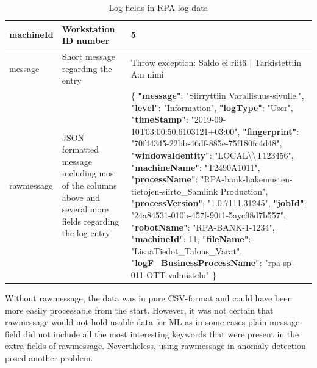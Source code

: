 \begin{table}[]
\begin{tabular}{|L{0.25\textwidth}|L{0.25\textwidth}|L{0.5\textwidth}|}
        machineId          & Workstation ID number                           & 5                                                                            \\ \hline
        message            & Short message regarding the entry               & Throw exception: Saldo ei riitä | \newline Tarkistettiin A:n nimi                    \\ \hline
        rawmessage         & JSON formatted message including most of the columns above and several more fields regarding the log entry &
        \{
        \textbf{"message"}: "Siirryttiin Varallisuus-sivulle.",\newline
        \textbf{"level"}: "Information",\newline
        \textbf{"logType"}: "User",\newline
        \textbf{"timeStamp"}: "2019-09-10T03:00:50.6103121+03:00",\newline
        \textbf{"fingerprint"}: "70f44345-22bb-46df-885e-75f180fc4d48",\newline
        \textbf{"windowsIdentity"}: "LOCAL\textbackslash{}\textbackslash{}T123456",\newline
        \textbf{"machineName"}: "T2490A1011",\newline
        \textbf{"processName"}: "RPA-bank-hakemusten-tietojen-siirto\_Samlink Production",\newline
        \textbf{"processVersion"}: "1.0.7111.31245",\newline
        \textbf{"jobId"}: "24a84531-010b-457f-90t1-5ayc98d7b557",\newline
        \textbf{"robotName"}: "RPA-BANK-1-1234",\newline
        \textbf{"machineId"}: 11,\newline
        \textbf{"fileName"}: "LisaaTiedot\_Talous\_Varat",\newline
        \textbf{"logF\_BusinessProcessName"}: "rpa-sp-011-OTT-valmistelu"  \}
        \\ \hline
    \end{tabular}
    \caption{Log fields in RPA log data}
    \label{tab:log-row-fields}
\end{table}

Without rawmessage,
the data was in pure CSV-format
and could have been more easily processable from the start.
However,
it was not certain
that rawmessage would not hold usable data for ML
as in some cases plain message-field did not include
all the most interesting keywords that were present
in the extra fields of rawmessage.
Nevertheless,
using rawmessage in anomaly detection
posed another problem.

